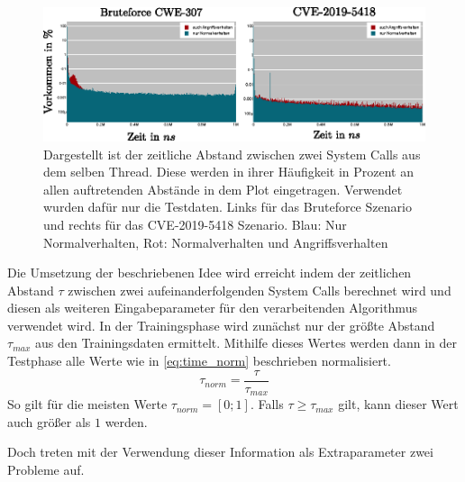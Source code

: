                     \begin{figure}
                        \centering
                        \includegraphics[width=\textwidth]{images/CVE-2012--Test-data-time_delta.eps}
                        \caption{Dargestellt ist der zeitliche Abstand zwischen zwei System Calls aus dem selben Thread.
                                 Diese werden in ihrer Häufigkeit in Prozent an allen auftretenden Abstände in dem Plot eingetragen.
                                 Verwendet wurden dafür nur die Testdaten. Links für das Bruteforce Szenario und rechts für das CVE-2019-5418 Szenario.
                                 Blau: Nur Normalverhalten, Rot: Normalverhalten und Angriffsverhalten}
                        \label{fig:time_delta}
                    \end{figure}

                    Die Umsetzung der beschriebenen Idee wird erreicht indem der zeitlichen Abstand $\tau$ zwischen zwei aufeinanderfolgenden System Calls berechnet wird und diesen als weiteren Eingabeparameter für den verarbeitenden Algorithmus verwendet wird.
                    In der Trainingsphase wird zunächst nur der größte Abstand $\tau_{max}$ aus den Trainingsdaten ermittelt.
                    Mithilfe dieses Wertes werden dann in der Testphase alle Werte wie in \autoref{eq:time_norm} beschrieben normalisiert.
                    \begin{equation}\label{eq:time_norm}
                        \tau_{norm} = \frac{\tau}{\tau_{max}}
                    \end{equation}
                    So gilt für die meisten Werte $\tau_{norm}=[0;1]$.
                    Falls $\tau\geq\tau_{max}$ gilt, kann dieser Wert auch größer als $1$ werden.

                    Doch treten mit der Verwendung dieser Information als Extraparameter zwei Probleme auf.

